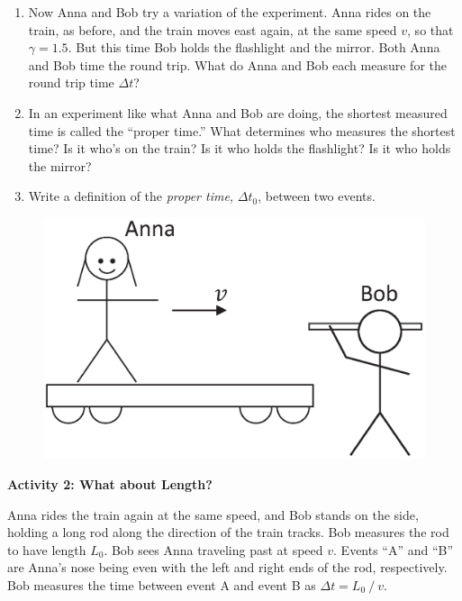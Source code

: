 \begin{enumerate}
\item Now Anna and Bob try a variation of the experiment.  Anna rides on the train, as before, and the train moves east again, at the same speed $v$, so that $\gamma=1.5$.  But this time Bob holds the flashlight and the mirror.  Both Anna and Bob time the round trip.  What do Anna and Bob each measure for the round trip time $\Delta t$?
\answerspace{0.5in}

\item In an experiment like what Anna and Bob are doing, the shortest measured time is called the ``proper time.''  What determines who measures the shortest time? Is it who's on the train?  Is it who holds the flashlight?  Is it who holds the mirror?
\answerspace{0.5in}

\item Write a definition of the \textit{proper time,} $\Delta t_0$, between two events.
\answerspace{0.5in}
\end{enumerate}

\begin{figure}
\begin{center}
\vspace{-0.4in}
\includegraphics[scale=0.4]{time_dilation_length_contraction/anna_and_bob2.eps}
\end{center}
\end{figure}

\textbf{Activity 2: What about Length?}

Anna rides the train again at the same speed, and Bob stands on the side, holding a long rod along the direction of the train tracks.  Bob measures the rod to have length $L_0$.  Bob sees Anna traveling past at speed $v$.  Events ``A'' and ``B'' are Anna's nose being even with the left and right ends of the rod, respectively.  Bob measures the time between event A and event B as $\Delta t=L_0 ⁄ v$.  

